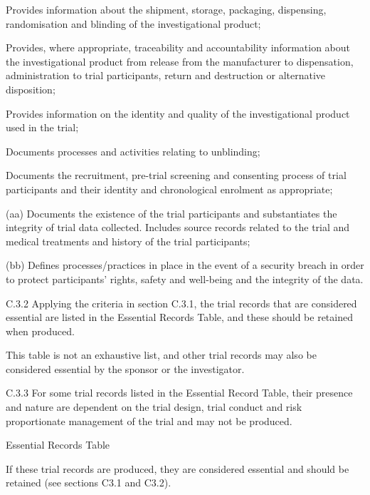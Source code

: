 \documentclass[11pt]{article}
\begin{document}
\begin{description}[leftmargin=2.5cm,style=sameline]
\item[(v)] Provides information about the shipment, storage, packaging, dispensing, randomisation and blinding of the investigational product;

\item[(w)] Provides, where appropriate, traceability and accountability information about the investigational product from release from the manufacturer to dispensation, administration to trial participants, return and destruction or alternative disposition;

\item[(x)] Provides information on the identity and quality of the investigational product used in the trial;

\item[(y)] Documents processes and activities relating to unblinding;

\item[(z)] Documents the recruitment, pre-trial screening and consenting process of trial participants and their identity and chronological enrolment as appropriate;

\end{description}

(aa) Documents the existence of the trial participants and substantiates the integrity of trial data collected. Includes source records related to the trial and medical treatments and history of the trial participants;


(bb) Defines processes/practices in place in the event of a security breach in order to protect participants' rights, safety and well-being and the integrity of the data.


C.3.2 Applying the criteria in section C.3.1, the trial records that are considered essential are listed in the Essential Records Table, and these should be retained when produced.


This table is not an exhaustive list, and other trial records may also be considered essential by the sponsor or the investigator.


C.3.3 For some trial records listed in the Essential Record Table, their presence and nature are dependent on the trial design, trial conduct and risk proportionate management of the trial and may not be produced.


Essential Records Table


If these trial records are produced, they are considered essential and should be retained (see sections C3.1 and C3.2).
\end{document}
